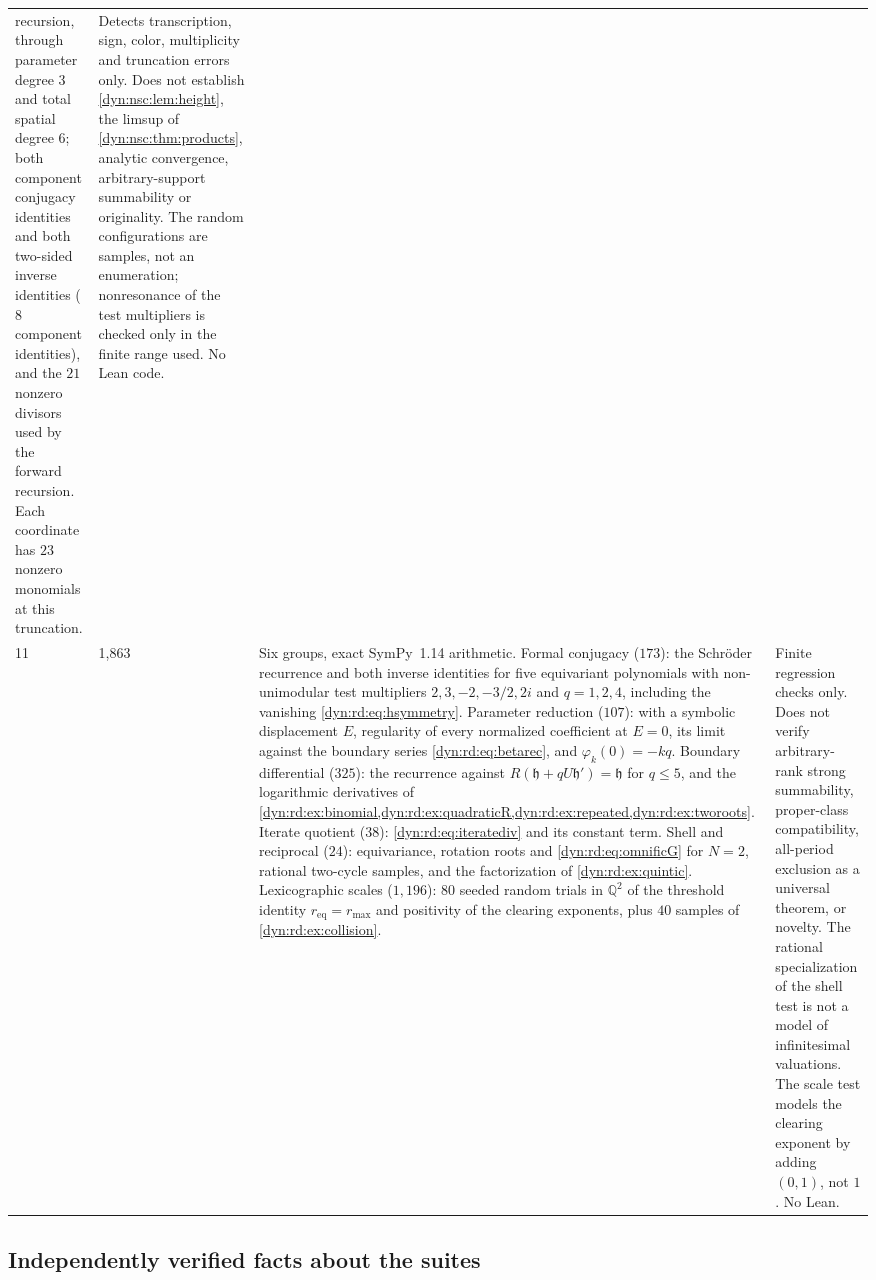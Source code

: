 \documentclass[11pt,letterpaper]{article}
\theoremstyle{definition}
\theoremstyle{remark}
\newcommand{\Q}{\mathbb Q}
\numberwithin{equation}{section}
\begin{document}
\begin{longtable}{@{}P{0.12\textwidth}P{0.10\textwidth}P{0.42\textwidth}P{0.29\textwidth}@{}}
recursion, through parameter degree $3$ and total spatial degree $6$; both
component conjugacy identities and both two-sided inverse identities ($8$
component identities), and the $21$ nonzero divisors used by the forward
recursion. Each coordinate has $23$ nonzero monomials at this truncation.
& Detects transcription, sign, color, multiplicity and truncation errors
only. Does not establish \cref{dyn:nsc:lem:height}, the limsup of
\cref{dyn:nsc:thm:products}, analytic convergence, arbitrary-support
summability or originality. The random configurations are samples, not an
enumeration; nonresonance of the test multipliers is checked only in the
finite range used. No Lean code.\\[4pt]
11 & 1{,}863 &
Six groups, exact SymPy~1.14 arithmetic. Formal conjugacy ($173$): the
Schr\"oder recurrence and both inverse identities for five equivariant
polynomials with non-unimodular test multipliers $2,3,-2,-3/2,2i$ and
$q=1,2,4$, including the vanishing \eqref{dyn:rd:eq:hsymmetry}. Parameter
reduction ($107$): with a symbolic displacement $E$, regularity of every
normalized coefficient at $E=0$, its limit against the boundary series
\eqref{dyn:rd:eq:betarec}, and $\varphi_k(0)=-kq$. Boundary differential
($325$): the recurrence against $R(\mathfrak h+qU\mathfrak h')=\mathfrak h$
for $q\le5$, and the logarithmic derivatives of
\cref{dyn:rd:ex:binomial,dyn:rd:ex:quadraticR,dyn:rd:ex:repeated,dyn:rd:ex:tworoots}.
Iterate quotient ($38$): \eqref{dyn:rd:eq:iteratediv} and its constant
term. Shell and reciprocal ($24$): equivariance, rotation roots and
\eqref{dyn:rd:eq:omnificG} for $N=2$, rational two-cycle samples, and the
factorization of \cref{dyn:rd:ex:quintic}. Lexicographic scales ($1{,}196$):
$80$ seeded random trials in $\Q^{2}$ of the threshold identity
$r_{\mathrm{eq}}=r_{\max}$ and positivity of the clearing exponents, plus
$40$ samples of \cref{dyn:rd:ex:collision}.
& Finite regression checks only. Does not verify arbitrary-rank strong
summability, proper-class compatibility, all-period exclusion as a universal
theorem, or novelty. The rational specialization of the shell test is not a
model of infinitesimal valuations. The scale test models the clearing
exponent by adding $(0,1)$, not $1$. No Lean.\\
\bottomrule
\end{longtable}

\subsection{Independently verified facts about the suites}
\label{dyn:subsec:orchestrator}
\end{document}
